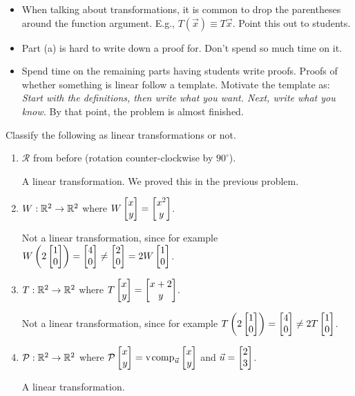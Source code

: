 \documentclass{workbook}
\begin{document}
\begin{slide}
\begin{annotation}
		\begin{notes}
			\begin{itemize}
				\item When talking about transformations, it is common
					to drop the parentheses around the function argument.
					E.g., $T(\vec x)\equiv T\vec x$. Point this out to students.
				\item Part (a) is hard to write down a proof for. Don't spend so much time on it.
				\item Spend time on the remaining parts having students write proofs. Proofs
					of whether something is linear follow a template. Motivate the template as:
					\emph{Start with the definitions, then write what you want. Next, write what you know.}
					By that point, the problem is almost finished.
			\end{itemize}
		\end{notes}
	\end{annotation}
	\begin{parts}
		\item Classify the following as linear transformations or not.
			\begin{enumerate}
				\item $\mathcal R$ from before (rotation counter-clockwise by $90^\circ$).
					\begin{solution}
						A linear transformation. We proved this in the previous problem.
					\end{solution}
				\item $W:\mathbb{R}^2\to\mathbb{R}^2$ where $W\mat{x\\y}=\matc{x^2\\y}$.
					\begin{solution}
						Not a linear transformation, since for example
						$W\left(2\mat{1\\0}\right)=\mat{4\\0}\neq\mat{2\\0}=2W\mat{1\\0}$.
					\end{solution}
				\item $T:\mathbb{R}^2\to\mathbb{R}^2$ where $T\mat{x\\y}=\matc{x+2\\y}$.
					\begin{solution}
						Not a linear transformation, since for example
						$T\left(2\mat{1\\0}\right) = \mat{4\\0} \neq 2T\mat{1\\0}$.
					\end{solution}
				\item $\mathcal P:\mathbb{R}^2\to\mathbb{R}^2$ where
					$\mathcal P\mat{x\\y}=\Comp_{\vec u}\mat{x\\y}$ and
					$\vec u=\mat{2\\3}$.
					\begin{solution}
						A linear transformation.


\end{solution}
\end{enumerate}
\end{parts}
\end{slide}
\end{document}
